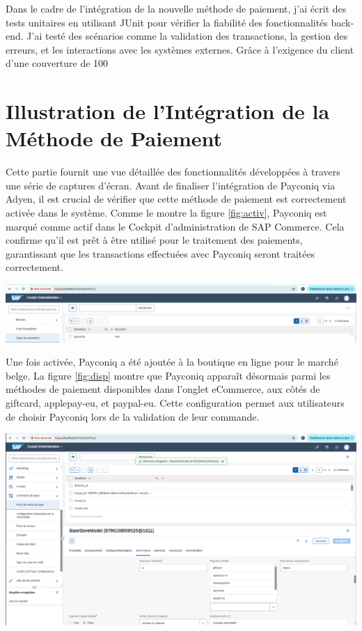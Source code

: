 Dans le cadre de l'intégration de la nouvelle méthode de paiement, j'ai écrit des tests unitaires en utilisant JUnit pour vérifier la fiabilité des fonctionnalités back-end. J'ai testé des scénarios comme la validation des transactions, la gestion des erreurs, et les interactions avec les systèmes externes. Grâce à l'exigence du client d'une couverture de 100%
\section{Illustration de l'Intégration de la Méthode de Paiement}
Cette partie fournit une vue détaillée des fonctionnalités développées à travers une série de captures d’écran.
Avant de finaliser l'intégration de Payconiq via Adyen, il est crucial de vérifier que cette méthode de paiement est correctement activée dans le système. Comme le montre la figure \ref{fig:activ}, Payconiq est marqué comme actif dans le Cockpit d'administration de SAP Commerce. 
Cela confirme qu'il est prêt à être utilisé pour le traitement des paiements, garantissant que les transactions effectuées avec Payconiq seront traitées correctement.
\begin{center}
    \centering
    \includegraphics[width=19cm]{Figures/Screens/VERIFIER QUE payment activer.png}
    \label{fig:activ}
\end{center}
Une fois activée, Payconiq a été ajoutée à la boutique en ligne pour le marché belge. La figure \ref{fig:disp} montre que Payconiq apparaît désormais parmi les méthodes de paiement disponibles dans l'onglet eCommerce, aux côtés de giftcard, applepay-eu, et paypal-eu. Cette configuration permet aux utilisateurs de choisir Payconiq lors de la validation de leur commande.
\begin{center}
    \centering
    \includegraphics[width=19cm]{Figures/Screens/activation du payconiq pour belge.png}
    \label{fig:disp}
\end{center}
